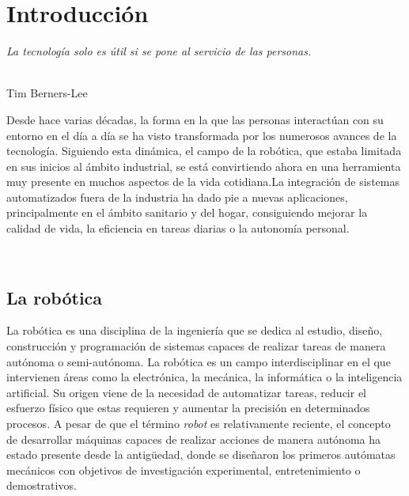 \chapter{Introducción}
\label{cap:capitulo1}
\setcounter{page}{1}

\begin{flushright}
\begin{minipage}[]{7cm}
\emph{La tecnología solo es útil si se pone al servicio de las personas.}\\
\end{minipage}\\

Tim Berners-Lee\\
\end{flushright}

\vspace{0.5cm}

Desde hace varias décadas, la forma en la que las personas interactúan con su entorno en el día a día se ha visto transformada por los numerosos avances de la tecnología. Siguiendo esta dinámica, el campo de la robótica, que estaba limitada en sus inicios al ámbito industrial, se está convirtiendo ahora en una herramienta muy presente en muchos aspectos de la vida cotidiana.La integración de sistemas automatizados fuera de la industria ha dado pie a nuevas aplicaciones, principalmente en el ámbito sanitario y del hogar, consiguiendo mejorar la calidad de vida, la eficiencia en tareas diarias o la autonomía personal.

\

\section{La robótica}
\label{sec:miseccion} %

La robótica es una disciplina de la ingeniería que se dedica al estudio, diseño, construcción y programación de sistemas capaces de realizar tareas de manera autónoma o semi-autónoma. La robótica es un campo interdisciplinar en el que intervienen áreas como la electrónica, la mecánica, la informática o la inteligencia artificial. Su origen viene de la necesidad de automatizar tareas, reducir el esfuerzo físico que estas requieren y aumentar la precisión en determinados procesos. A pesar de que el término \textit{robot} es relativamente reciente, el concepto de desarrollar máquinas capaces de realizar acciones de manera autónoma ha estado presente desde la antigüedad, donde se diseñaron los primeros autómatas mecánicos con objetivos de investigación experimental, entretenimiento o demostrativos.\\


